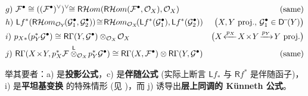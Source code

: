 \begin{Pro}
\begin{small}
\begin{align}
		&g)\mkern+6mu\mathcal{F}^\bullet\cong((\mathcal{F}^\bullet)^{\vee})^\vee\!\!\cong \mathsf{R}\mathcal{H}om(\mathsf{R}\mathcal{H}om(\mathcal{F}^\bullet,\mathcal{O}_X),\mathcal{O}_X) & (\text{same}) \nonumber \\
		&h)\mkern+6mu\mathsf{L}f^*(\mathsf{R}\mathcal{H}om_{\mathcal{O}_Y}\!(\mathcal{G}_1^\bullet,\mathcal{G}_2^\bullet))\!\cong\! \mathsf{R}\mathcal{H}om_{\mathcal{O}_X}\!(\mathsf{L}f^*(\mathcal{G}_1^\bullet),\mathsf{L}f^*(\mathcal{G}_2^\bullet)) & \big(X,Y\text{ proj.},\,\mathcal{G}_1^\bullet\in\mathsf{D^{\!-}}\!(Y)\big) \nonumber \\
		&i)\mkern+6mup_{X*}(p_Y^*\mathcal{G}^\bullet)\cong\mathsf{R}\Gamma(Y,\mathcal{G}^\bullet)\otimes_{\mathcal{O}_X}\!\mathcal{O}_X & \big(X\!\xleftarrow{p_X}\!X\!\times \!Y\!\xrightarrow{p_Y}\!Y\text{ proj.}\big) \nonumber \\
		&j)\mkern+6mu\mathsf{R}\Gamma(X\!\times\! Y,p_X^*\mathcal{F}\overset{\mathsf{L}}{\otimes}_{\mathcal{O}_X}\!p_Y^*\mathcal{G}^\bullet)\cong\mathsf{R}\Gamma(X,\mathcal{F}^\bullet)\otimes\mathsf{R}\Gamma(Y,\mathcal{G}^\bullet) & (\text{same})  \nonumber
	\end{align}\endgroup\end{small}
\!\!\!举其要者：a\textup) 是\textbf{投影公式}，c\textup) 是\textbf{伴随公式} \textup(实际上断言 $\mathsf{L}f_*$ 与 $\mathsf{R}f^*$ 是伴随函子\textup)，i\textup) 是\textbf{平坦基变换} 的特殊情形 \textup(见 \textup{\cite[equation (3.18)]{[Huy06]}}\textup)，而 j\textup) 诱导出\textbf{层上同调的 Künneth 公式}。
\end{Pro} 


